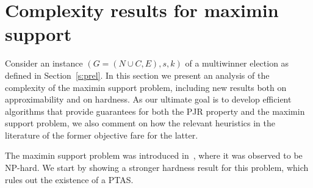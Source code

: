 \section{Complexity results for maximin support}\label{s:complexity}

Consider an instance $(G=(N\cup C, E), s, k)$ of a multiwinner election as defined in Section~\ref{s:prel}. 
In this section we present an analysis of the complexity of the maximin support problem, including new results both on approximability and on hardness. As our ultimate goal is to develop efficient algorithms that provide guarantees for both the PJR property and the maximin support problem, we also comment on how the relevant heuristics in the literature of the former objective fare for the latter. 

The maximin support problem was introduced in~\cite{sanchez2016maximin}, where it was observed to be NP-hard. We start by showing a stronger hardness result for this problem, which rules out the existence of a PTAS.

